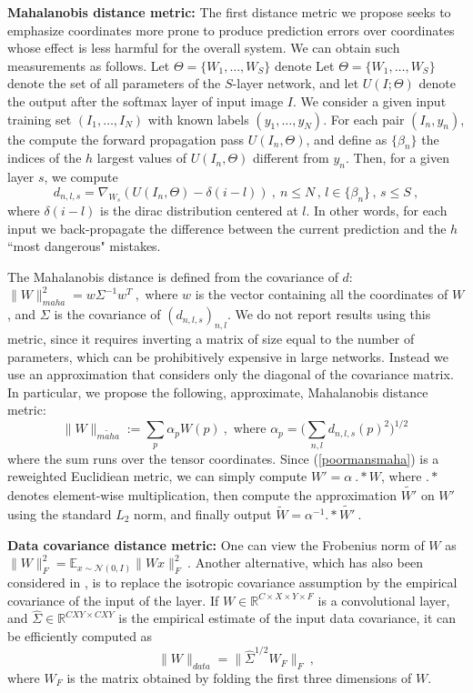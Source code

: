 {\bf Mahalanobis distance metric: }
The first distance metric we propose seeks to emphasize coordinates more prone to produce prediction errors over 
coordinates whose effect is less harmful for the overall system. 
We can obtain such measurements as follows.
Let $\Theta=\{W_1,\dots,W_S\}$ denote
Let $\Theta=\{W_1,\dots,W_S\}$ denote
the set of all parameters of the $S$-layer network, and let $U(I; \Theta)$ denote the output 
after the softmax layer of input image $I$.
We consider  a given input training set $(I_1,\dots,I_N)$ 
with known labels $(y_1,\dots,y_N)$. For each pair $(I_n, y_n)$, 
the compute the forward propagation pass $U(I_n, \Theta)$, and 
define as $\{\beta_n\}$ the indices of the $h$ largest values of  $U(I_n, \Theta)$ 
different from $y_n$.
Then, for a given layer $s$, we compute
\begin{equation}
\label{approxi}
d_{n,l,s} = \nabla_{W_s} \left( U(I_n, \Theta) - \delta(i - l)\right)~,~n\leq N\,,\, l \in \{\beta_n\}\,,\, s\leq S~,
\end{equation}
where $\delta(i-l)$ is the dirac distribution centered at $l$.
In other words, for each input we back-propagate the difference between the current prediction and the 
$h$ ``most dangerous" mistakes. 

The Mahalanobis distance is defined from the covariance of 
$d$: $\| W \|_{maha}^2 = w \Sigma^{-1} w^T~,$
where $w$ is the vector containing all the coordinates of $W$, and $\Sigma$ is the covariance of $(d_{n,l,s})_{n,l}$. 
We do not report results using this metric, since it requires inverting a matrix of size equal to the number 
of parameters, which can be prohibitively expensive in large networks.
Instead we use an approximation that considers only the diagonal of the covariance matrix. 
In particular, we propose the following, approximate, Mahalanobis distance metric: 
\begin{equation}
\label{poormansmaha}
\| W \|_{\widetilde{maha}} := \sum_p \alpha_p W(p) ~,\text{ where } \alpha_p = \Big( \sum_{n,l} d_{n,l,s}(p)^2 \Big)^{1/2}~
\end{equation}
where the sum runs over the tensor coordinates.
Since (\ref{poormansmaha}) is a reweighted Euclidiean metric, we 
can simply compute $W' = \alpha~ .* W$, where $.*$ denotes element-wise multiplication, 
then compute the approximation $\widetilde{W'}$ on $W'$ using the standard $L_2$ norm, 
and finally output $\widetilde{W} = \alpha^{-1} .* \widetilde{W'}~.$

{\bf Data covariance distance metric: }
One can view the Frobenius norm of $W$ as
$\| W \|_F^2 = \mathbb{E}_{x \sim \mathcal{N}(0,I)} \| W x \|_F^2 ~.$
Another alternative, which has also been considered in \cite{zisserman14}, is to replace the isotropic covariance
assumption by the empirical covariance of the input of the layer. If $W \in \mathbb{R}^{C \times X \times Y \times F}$ 
is a convolutional layer, and $\widehat{\Sigma} \in \mathbb{R}^{CXY \times CXY}$ is the empirical estimate of the input data covariance, 
it can be efficiently computed as 
\begin{equation}
\| W \|_{data} = \| \widehat{\Sigma}^{1/2} W_F \|_F~, 
\end{equation}
where $W_F$ is the matrix obtained by folding the first three dimensions of $W$.

